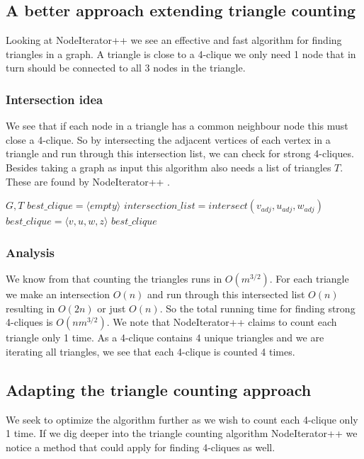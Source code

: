 \documentclass{article}
\begin{document}
\subsection{A better approach extending triangle counting}
Looking at NodeIterator++ \cite{countingTriangles} we see an effective and fast algorithm for finding triangles in a graph. A triangle is close to a 4-clique we only need 1 node that in turn should be connected to all 3 nodes in the triangle.

\subsubsection{Intersection idea}
We see that if each node in a triangle has a common neighbour node this must close a 4-clique. So by intersecting the adjacent vertices of each vertex in a triangle and run through this intersection list, we can check for strong 4-cliques. Besides taking a graph as input this algorithm also needs a list of triangles $T$. These are found by NodeIterator++ \cite{countingTriangles}.

\begin{algorithm}
\caption{$strong\_4clique\_finder+$}
\begin{algorithmic}
\REQUIRE $G,T$
\STATE $best\_clique = \langle empty\rangle $
	\STATE $intersection\_list = intersect(v_{adj}, u_{adj}, w_{adj})$
				\STATE $best\_clique = \langle v,u,w,z\rangle $
			\ENDIF
		\ENDFOR
	\ENDIF
\ENDFOR
\RETURN $best\_clique$
\end{algorithmic}
\label{fig 3 : Strong 4 Clique finder+}
\end{algorithm}

\subsubsection{Analysis}
We know from \cite{countingTriangles} that counting the triangles runs in $O(m^{3/2})$. For each triangle we make an intersection $O(n)$ and run through this intersected list $O(n)$ resulting in $O(2n)$ or just $O(n)$. So the total running time for finding strong 4-cliques is $O(nm^{3/2})$. We note that NodeIterator++ claims to count each triangle only 1 time. As a 4-clique contains 4 unique triangles and we are iterating all triangles, we see that each 4-clique is counted 4 times.

\subsection{Adapting the triangle counting approach}
We seek to optimize the algorithm further as we wish to count each 4-clique only 1 time. If we dig deeper into the triangle counting algorithm NodeIterator++ \cite{countingTriangles} we notice a method that could apply for finding 4-cliques as well.
\end{document}
